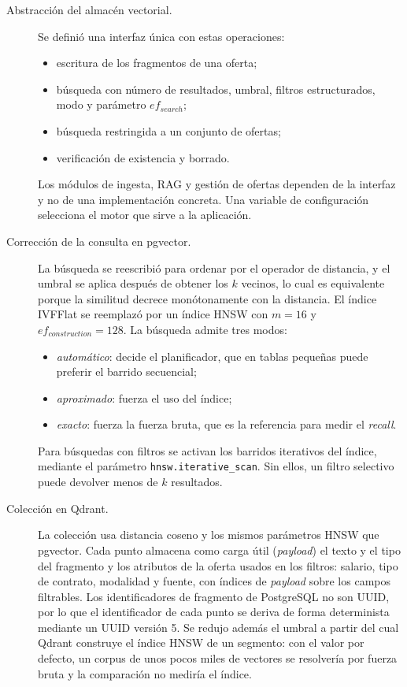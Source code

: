 \begin{description}
    \item[Abstracción del almacén vectorial.] Se definió una interfaz única con estas operaciones:
    \begin{itemize}
        \item escritura de los fragmentos de una oferta;
        \item búsqueda con número de resultados, umbral, filtros estructurados, modo y parámetro $ef_{search}$;
        \item búsqueda restringida a un conjunto de ofertas;
        \item verificación de existencia y borrado.
    \end{itemize}
    Los módulos de ingesta, RAG y gestión de ofertas dependen de la interfaz y no de una implementación concreta. Una variable de configuración selecciona el motor que sirve a la aplicación.
    \item[Corrección de la consulta en pgvector.] La búsqueda se reescribió para ordenar por el operador de distancia, y el umbral se aplica después de obtener los $k$ vecinos, lo cual es equivalente porque la similitud decrece monótonamente con la distancia. El índice IVFFlat se reemplazó por un índice HNSW \citep{Malkov2020} con $m = 16$ y $ef_{construction} = 128$. La búsqueda admite tres modos:
    \begin{itemize}
        \item \emph{automático}: decide el planificador, que en tablas pequeñas puede preferir el barrido secuencial;
        \item \emph{aproximado}: fuerza el uso del índice;
        \item \emph{exacto}: fuerza la fuerza bruta, que es la referencia para medir el \textit{recall}.
    \end{itemize}
    Para búsquedas con filtros se activan los barridos iterativos del índice, mediante el parámetro \texttt{hnsw.\allowbreak iterative\_scan}. Sin ellos, un filtro selectivo puede devolver menos de $k$ resultados.
    \item[Colección en Qdrant.] La colección usa distancia coseno y los mismos parámetros HNSW que pgvector. Cada punto almacena como carga útil (\textit{payload}) el texto y el tipo del fragmento y los atributos de la oferta usados en los filtros: salario, tipo de contrato, modalidad y fuente, con índices de \textit{payload} sobre los campos filtrables. Los identificadores de fragmento de PostgreSQL no son UUID, por lo que el identificador de cada punto se deriva de forma determinista mediante un UUID versión 5. Se redujo además el umbral a partir del cual Qdrant construye el índice HNSW de un segmento: con el valor por defecto, un corpus de unos pocos miles de vectores se resolvería por fuerza bruta y la comparación no mediría el índice.

\end{description}
